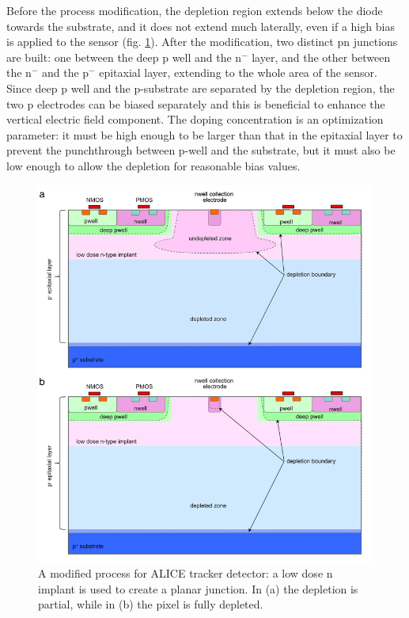       Before the process modification, the depletion region extends below the diode towards the substrate, and it does not extend much laterally, even if a high bias is applied to the sensor (fig. \ref{fig:modified_process}). 
      After the modification, two distinct pn junctions are built: one between the deep p well and the n$^-$ layer, and the other between the n$^-$ and the p$^-$ epitaxial layer, extending to the whole area of the sensor.
      Since deep p well and the p-substrate are separated by the depletion region, the two p electrodes can be biased separately and this is beneficial to enhance the vertical electric field component.
      The doping concentration is an optimization parameter: it must be high enough to be larger than that in the epitaxial layer to prevent the punchthrough between p-well and the substrate, but it must also be low enough to allow the depletion for reasonable bias values.
      \begin{figure}
         \centering
         \includegraphics[width=.7\linewidth]{figures/Pixel_detectors/modified_process.png}
         \caption{A modified process for ALICE tracker detector: a low dose n implant is used to create a planar junction. In (a) the depletion is partial, while in (b) the pixel is fully depleted.}
         \label{fig:modified_process}
      \end{figure}

